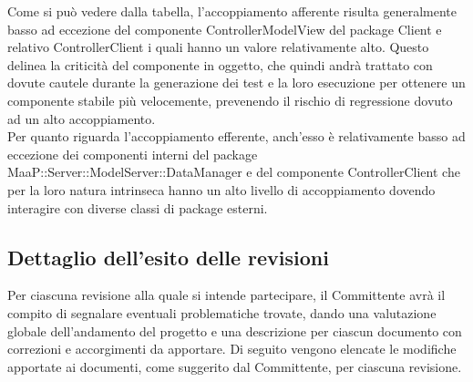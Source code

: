 Come si può vedere dalla tabella, l'accoppiamento afferente risulta generalmente basso ad eccezione del componente ControllerModelView del package Client e relativo ControllerClient i quali hanno un valore relativamente alto. Questo delinea la criticità del componente in oggetto, che quindi andrà trattato con dovute cautele durante la generazione dei test e la loro esecuzione per ottenere un componente stabile più velocemente, prevenendo il rischio di regressione dovuto ad un alto accoppiamento.\\
Per quanto riguarda l'accoppiamento efferente, anch'esso è relativamente basso ad eccezione dei componenti interni del package MaaP::Server::ModelServer::DataManager e del componente ControllerClient che per la loro natura intrinseca hanno un alto livello di accoppiamento dovendo interagire con diverse classi di package esterni.

\subsection{Dettaglio dell'esito delle revisioni}
Per ciascuna revisione alla quale si intende partecipare, il Committente avrà il compito di segnalare eventuali problematiche trovate, dando una valutazione globale dell'andamento del progetto e una descrizione per ciascun documento con correzioni e accorgimenti da apportare.
Di seguito vengono elencate le modifiche apportate ai documenti, come suggerito dal Committente, per ciascuna revisione.
